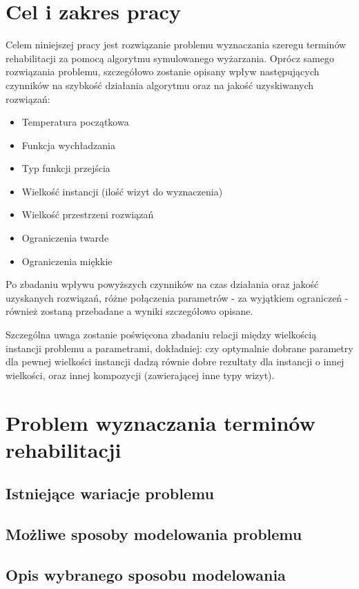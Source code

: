 \chapter{Cel i zakres pracy}
Celem niniejszej pracy jest rozwiązanie problemu wyznaczania szeregu terminów rehabilitacji za pomocą algorytmu symulowanego wyżarzania. Oprócz samego rozwiązania problemu, szczegółowo zostanie opisany wpływ następujących czynników na szybkość działania algorytmu oraz na jakość uzyskiwanych rozwiązań:

\begin{itemize}
\item Temperatura początkowa
\item Funkcja wychładzania
\item Typ funkcji przejścia
\item Wielkość instancji (ilość wizyt do wyznaczenia)
\item Wielkość przestrzeni rozwiązań
\item Ograniczenia twarde
\item Ograniczenia miękkie
\end{itemize}
Po zbadaniu wpływu powyższych czynników na czas działania oraz jakość uzyskanych rozwiązań, różne połączenia parametrów - za wyjątkiem ograniczeń - również zostaną przebadane a wyniki szczegółowo opisane. 

Szczególna uwaga zostanie poświęcona zbadaniu relacji między wielkością instancji problemu a parametrami, dokładniej: czy optymalnie dobrane parametry dla pewnej wielkości instancji dadzą równie dobre rezultaty dla instancji o innej wielkości, oraz innej kompozycji (zawierającej inne typy wizyt).

\chapter{Problem wyznaczania terminów rehabilitacji}
\section{Istniejące wariacje problemu}
\section{Możliwe sposoby modelowania problemu}
\section{Opis wybranego sposobu modelowania}


